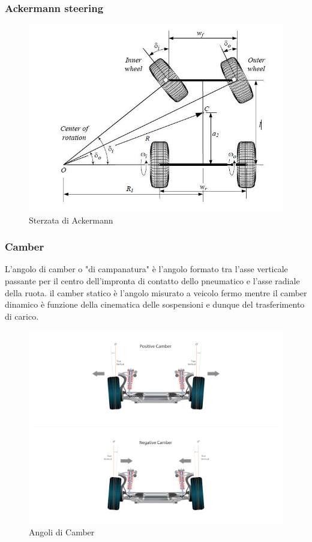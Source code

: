 \subsubsection{Ackermann steering}

\begin{figure}[ht]
    \centering
    \includegraphics[scale=0.4]{Immagini/Lateral dynamics/Angolo-di-Ackermann.jpg}
    \caption{Sterzata di Ackermann}
    \label{fig:Ackermann}
\end{figure}

\subsubsection{Camber}
L'angolo di camber o "di campanatura" è l'angolo formato tra l'asse verticale passante per il centro dell'impronta di contatto dello pneumatico e l'asse radiale della ruota.
il camber statico è l'angolo misurato a veicolo fermo mentre il camber dinamico è funzione della cinematica delle sospensioni e dunque del trasferimento di carico.

\begin{figure}[ht]
    \centering
    \includegraphics[scale=0.4]{Immagini/Lateral dynamics/Camber.jpg}
    \caption{Angoli di Camber}
    \label{fig:Camber}
\end{figure}


